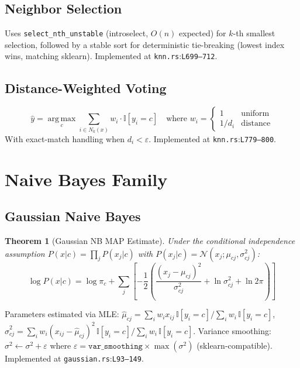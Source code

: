 \documentclass[11pt,a4paper]{article}
\newtheorem{theorem}{Theorem}[section]
\theoremstyle{remark}
\newcommand{\coderef}[2]{\texttt{#1}:\texttt{L#2}}
\newcommand{\II}{\mathbb{I}}
\newcommand{\argmax}{\operatorname*{arg\,max}}
\begin{document}
\subsection{Neighbor Selection}

Uses \texttt{select\_nth\_unstable} (introselect, $O(n)$ expected) for
$k$-th smallest selection, followed by a stable sort for deterministic
tie-breaking (lowest index wins, matching sklearn).
Implemented at \coderef{knn.rs}{699--712}. \checkmark

\subsection{Distance-Weighted Voting}

\begin{equation}
  \hat{y} = \argmax_c \sum_{i \in N_k(x)} w_i \cdot \II[y_i = c]
  \quad \text{where } w_i = \begin{cases} 1 & \text{uniform} \\ 1/d_i & \text{distance} \end{cases}
\end{equation}
With exact-match handling when $d_i < \varepsilon$.
Implemented at \coderef{knn.rs}{779--800}. \checkmark

\section{Naive Bayes Family}
\label{sec:nb}

\subsection{Gaussian Naive Bayes}

\begin{theorem}[Gaussian NB MAP Estimate]
Under the conditional independence assumption $P(x|c) = \prod_j P(x_j|c)$
with $P(x_j|c) = \mathcal{N}(x_j; \mu_{cj}, \sigma^2_{cj})$:
\begin{equation}
  \log P(x|c) = \log \pi_c + \sum_j \left[
    -\frac{1}{2}\left(\frac{(x_j - \mu_{cj})^2}{\sigma^2_{cj}}
    + \ln \sigma^2_{cj} + \ln 2\pi\right)
  \right]
  \label{eq:gnb}
\end{equation}
\end{theorem}

Parameters estimated via MLE:
$\hat\mu_{cj} = \sum_i w_i x_{ij} \, \II[y_i{=}c] / \sum_i w_i \, \II[y_i{=}c]$,
$\hat\sigma^2_{cj} = \sum_i w_i (x_{ij} - \hat\mu_{cj})^2 \, \II[y_i{=}c] / \sum_i w_i \, \II[y_i{=}c]$.
Variance smoothing: $\sigma^2 \leftarrow \sigma^2 + \varepsilon$ where
$\varepsilon = \texttt{var\_smoothing} \times \max(\sigma^2)$ (sklearn-compatible).
Implemented at \coderef{gaussian.rs}{93--149}. \checkmark
\end{document}
